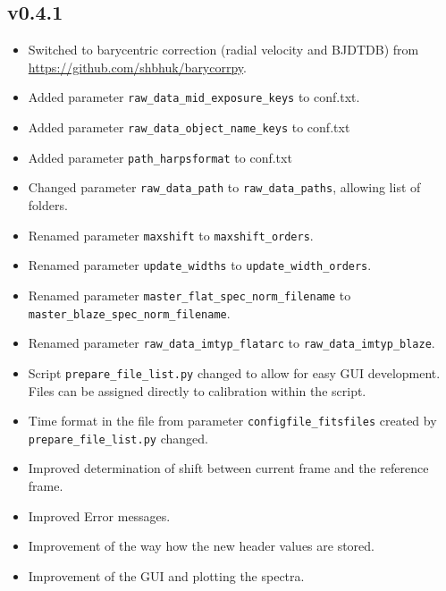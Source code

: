 \documentclass[10pt,a4paper]{article}
\begin{document}
\subsection*{v0.4.1}
\begin{itemize}\setlength\itemsep{0em}
  \item Switched to barycentric correction (radial velocity and BJDTDB) from \url{https://github.com/shbhuk/barycorrpy}.
  \item Added parameter \verb|raw_data_mid_exposure_keys| to conf.txt.
  \item Added parameter \verb|raw_data_object_name_keys| to conf.txt
  \item Added parameter \verb|path_harpsformat| to conf.txt
  \item Changed parameter \verb|raw_data_path| to \verb|raw_data_paths|, allowing list of folders.
  \item Renamed parameter \verb|maxshift| to \verb|maxshift_orders|.
  \item Renamed parameter \verb|update_widths| to \verb|update_width_orders|.
  \item Renamed parameter \verb|master_flat_spec_norm_filename| to \verb|master_blaze_spec_norm_filename|.
  \item Renamed parameter \verb|raw_data_imtyp_flatarc| to \verb|raw_data_imtyp_blaze|.
  \item Script \verb|prepare_file_list.py| changed to allow for easy GUI development. Files can be assigned directly to calibration within the script. 
  \item Time format in the file from parameter \verb|configfile_fitsfiles| created by \verb|prepare_file_list.py| changed.
  \item Improved determination of shift between current frame and the reference frame.
  \item Improved Error messages.
  \item Improvement of the way how the new header values are stored.
  \item Improvement of the GUI and plotting the spectra.
\end{itemize}
\end{document}
